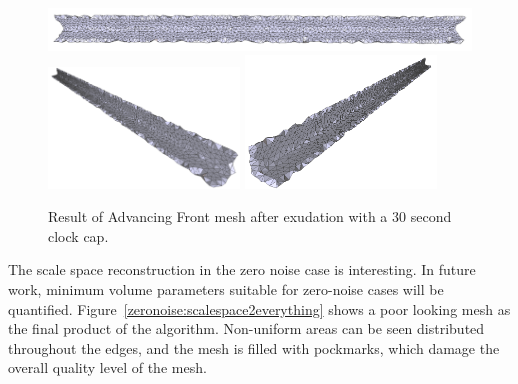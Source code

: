 \documentclass[12pt]{drexelthesis}
\begin{document}
\begin{figure}[!ht]
	\centering
		\includegraphics[width=5in]{simulated-lab-scan/0noise/optimizedNeat/advancingfronteverything00.png}
		\includegraphics[width=2in]{simulated-lab-scan/0noise/optimizedNeat/advancingfronteverything01.png}
		\includegraphics[width=2in]{simulated-lab-scan/0noise/optimizedNeat/advancingfronteverything02.png}
		\caption[Advancing Front mesh after exudation with a 30 second clock cap]{\centering  Result of Advancing Front mesh after exudation with a 30 second clock cap.}
	\label{zeronoise:advancedeverything}
\end{figure}

The scale space reconstruction in the zero noise case is interesting. In future work, minimum volume parameters suitable for zero-noise cases will be quantified. Figure~\ref{zeronoise:scalespace2everything} shows a poor looking mesh as the final product of the algorithm. Non-uniform areas can be seen distributed throughout the edges, and the mesh is filled with pockmarks, which damage the overall quality level of the mesh. 
\end{document}
